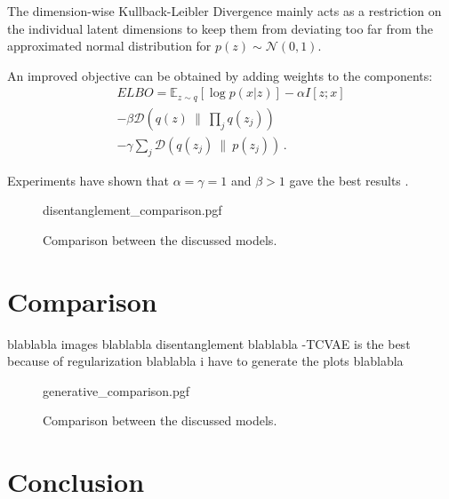 \documentclass[a4paper]{IEEEtran}
\begin{document}
The dimension-wise Kullback-Leibler Divergence mainly acts as a restriction on the individual latent dimensions to keep them from deviating too far from the approximated normal distribution for $p(z) \sim \mathcal{N}(0,1)$.

An improved objective can be obtained by adding weights to the components:
\begin{align*}
	ELBO = \mathbb{E}_{z \sim q}\left[ \log p(x|z) \right] - \alpha I[z;x] \\ - \beta \mathcal{D}(q(z) \ \| \  \prod_{j} q(z_j)) \\ - \gamma \sum_j \mathcal{D}(q(z_j) \ \| \ p(z_j))\,.
\end{align*}

Experiments have shown that $\alpha = \gamma = 1$ and $\beta > 1$ gave the best results \cite{chen2019isolating}.

\begin{figure*}[h]
	\centering
    {disentanglement_comparison.pgf}
    \caption{Comparison between the discussed models.}
    \label{fig:disentanglement}
\end{figure*}

\section{Comparison}

blablabla images blablabla disentanglement blablabla \textbeta -TCVAE is the best because of regularization blablabla i have to generate the plots blablabla

\begin{figure}[H]
	\centering
    {generative_comparison.pgf}
    \caption{Comparison between the discussed models.}
    \label{fig:generative}
\end{figure}

\section{Conclusion}



\end{document}
